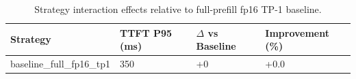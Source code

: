 \begin{table}
\caption{Strategy interaction effects relative to full-prefill fp16 TP-1 baseline.}
\label{tab:interactions}
\begin{tabular}{llll}
\toprule
Strategy & TTFT P95 (ms) & $\Delta$ vs Baseline & Improvement (\%) \\
\midrule
baseline\_full\_fp16\_tp1 & 350 & +0 & +0.0 \\
\bottomrule
\end{tabular}
\end{table}
